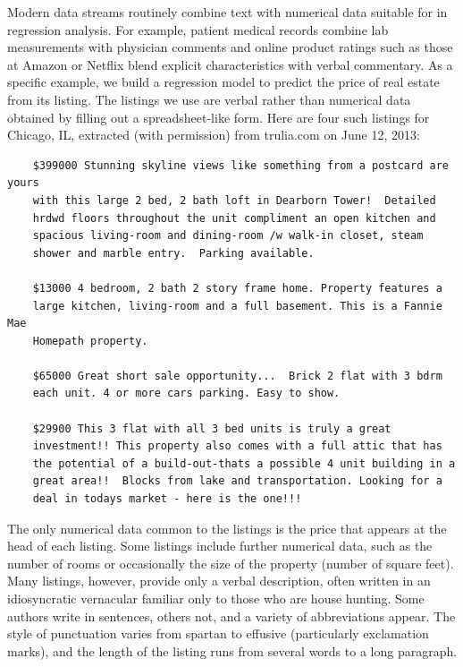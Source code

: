 \documentclass[12pt]{article}
\begin{document}
 Modern data streams routinely combine text with numerical data suitable for in
 regression analysis.  For example, patient medical records combine lab
 measurements with physician comments and online product ratings such as those
 at Amazon or Netflix blend explicit characteristics with verbal commentary. As
 a specific example, we build a regression model to predict the price of real
 estate from its listing.  The listings we use are verbal rather than
 numerical data obtained by filling out a spreadsheet-like form.  Here are four
 such listings for Chicago, IL, extracted (with permission) from trulia.com on June 12, 2013:

 \begin{verbatim}
    $399000 Stunning skyline views like something from a postcard are yours
    with this large 2 bed, 2 bath loft in Dearborn Tower!  Detailed
    hrdwd floors throughout the unit compliment an open kitchen and
    spacious living-room and dining-room /w walk-in closet, steam
    shower and marble entry.  Parking available. 

    $13000 4 bedroom, 2 bath 2 story frame home. Property features a
    large kitchen, living-room and a full basement. This is a Fannie Mae
    Homepath property. 

    $65000 Great short sale opportunity...  Brick 2 flat with 3 bdrm
    each unit. 4 or more cars parking. Easy to show. 

    $29900 This 3 flat with all 3 bed units is truly a great
    investment!! This property also comes with a full attic that has
    the potential of a build-out-thats a possible 4 unit building in a 
    great area!!  Blocks from lake and transportation. Looking for a
    deal in todays market - here is the one!!! 
 \end{verbatim}

 \noindent
 The only numerical data common to the listings is the price that appears at
 the head of each listing.  Some listings include further numerical data, such
 as the number of rooms or occasionally the size of the property (number of
 square feet).  Many listings, however, provide only a verbal description,
 often written in an idiosyncratic vernacular familiar only to those who are
 house hunting. Some authors write in sentences, others not, and a variety of
 abbreviations appear.  The style of punctuation varies from spartan to effusive
 (particularly exclamation marks), and the length of the listing runs from
 several words to a long paragraph.
\end{document}
